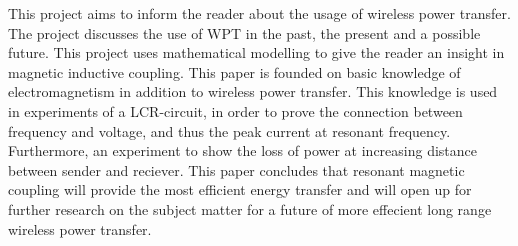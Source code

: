 This project aims to inform the reader about the usage of wireless power transfer. The project discusses the use of WPT in the past, the present and a possible future. This project uses mathematical modelling to give the reader an insight in magnetic inductive coupling. This paper is founded on basic knowledge of electromagnetism in addition to wireless power transfer. This knowledge is used in experiments of a LCR-circuit, in order to prove the connection between frequency and voltage, and thus the peak current at resonant frequency. Furthermore, an experiment to show the loss of power at increasing distance between sender and reciever. This paper concludes that resonant magnetic coupling will provide the most efficient energy transfer and will open up for further research on the subject matter for a future of more effecient long range wireless power transfer.